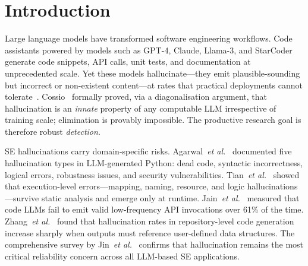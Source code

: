 \documentclass[runningheads]{llncs}
\newcommand{\etal}{\textit{et al.}}
\begin{document}
\section{Introduction}
\label{sec:intro}

Large language models have transformed software engineering workflows. Code assistants powered by models such as GPT-4, Claude, Llama-3, and StarCoder generate code snippets, API calls, unit tests, and documentation at unprecedented scale. Yet these models hallucinate---they emit plausible-sounding but incorrect or non-existent content---at rates that practical deployments cannot tolerate~\cite{huang2025survey,cossio2025taxonomy}. Cossio~\cite{cossio2025taxonomy} formally proved, via a diagonalisation argument, that hallucination is an \emph{innate} property of any computable LLM irrespective of training scale; elimination is provably impossible. The productive research goal is therefore robust \emph{detection}.

SE hallucinations carry domain-specific risks. Agarwal~\etal~\cite{agarwal2025codemirage} documented five hallucination types in LLM-generated Python: dead code, syntactic incorrectness, logical errors, robustness issues, and security vulnerabilities. Tian~\etal~\cite{tian2025codehalu} showed that execution-level errors---mapping, naming, resource, and logic hallucinations---survive static analysis and emerge only at runtime. Jain~\etal~\cite{jain2025codeapi} measured that code LLMs fail to emit valid low-frequency API invocations over 61\% of the time. Zhang~\etal~\cite{zhang2025llmhallucinations} found that hallucination rates in repository-level code generation increase sharply when outputs must reference user-defined data structures. The comprehensive survey by Jin~\etal~\cite{jin2025llmsurvey} confirms that hallucination remains the most critical reliability concern across all LLM-based SE applications.
\end{document}
